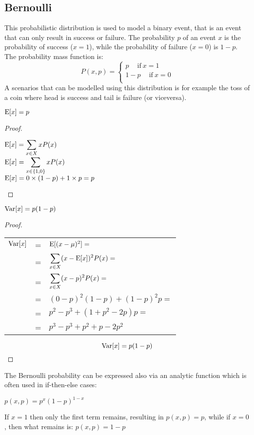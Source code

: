 \subsection{Bernoulli}
This probabilistic distribution is used to model a binary event, that is an event that can only result in success or failure. \newline
The probability $p$ of an event $x$ is the probability of success ($x=1$), while the probability of failure ($x=0$) is $1-p$. The probability mass function is:
\[P(x, p)=
\begin{cases}
	p\quad~\text{if}~x=1\\
	1-p\quad~\text{if}~x=0\\
\end{cases}
\]
A scenarios that can be modelled using this distribution is for example the toss of a coin where head is success and tail is failure (or viceversa).
\begin{theorem}
\begin{center}
	$\displaystyle \text{E}[x]=p$
\end{center}
\end{theorem}
\begin{proof}
\hspace{1cm}\\
\begin{center}
	$\displaystyle \text{E}[x]=\displaystyle\sum_{x\in X} xP(x)$ \\
	$\displaystyle \text{E}[x]=\displaystyle\sum_{x\in \{1,0\}} xP(x)$\\
	$\displaystyle \text{E}[x]=0\times (1-p)+1 \times p=p$
\end{center}
\end{proof}
\begin{theorem}
\begin{center}
	$\displaystyle \text{Var}[x]=p(1-p)$
\end{center}
\end{theorem} 
\begin{proof}
\hspace{1cm}\\
\begin{center}
\begin{tabular}{rcl}
	$\text{Var}[x]$&=&$\text{E}[(x-\mu )^2]=$\\
			&=&$\displaystyle\sum_{x\in X}(x-\text{E}[x])^2P(x)=$\\
			&=&$\displaystyle\sum_{x\in X}(x-p)^2P(x)=$\\
			&=&$(0-p)^2(1-p)+(1-p)^2p=$\\
			&=&$p^2-p^3+(1+p^2-2p)p=$\\
			&=&$p^3-p^3+p^2+p-2p^2$\\
\end{tabular}
\end{center}
\[\text{Var}[x]=p(1-p)\]
\end{proof}
The Bernoulli probability can be expressed also via an analytic function which is often used in if-then-else cases:
\begin{center}
	$\displaystyle p(x,p)=p^x(1-p)^{1-x}$
\end{center}
If $x=1$ then only the first term remains, resulting in $p(x,p)=p$, while if $x=0$, then what remains is: $p(x,p)=1-p$
%
%

